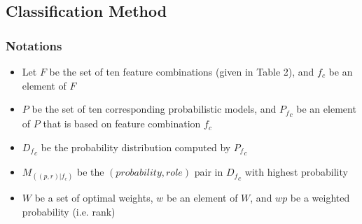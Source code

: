 \documentclass[11pt]{article}
\begin{document}
\subsection{Classification Method}
\subsubsection*{Notations}
\begin{itemize}
\item Let $F$ be the set of ten feature combinations (given in Table 2), and $f_c$ be an element of $F$
\item $P$ be the set of ten corresponding probabilistic models, and ${P_f}_c$ be an element of $P$ that is based on feature combination $f_c$ 
\item ${D_f}_c$ be the probability distribution computed by ${P_f}_c$ 
\item $M_{((p,r)|f_c)}$ be the $(probability,role)$ pair in  ${D_f}_c$ with highest probability
\item $W$ be a set of optimal weights, $w$ be an element of $W$, and $wp$ be a weighted probability (i.e. rank)
\end{itemize} 
\end{document}
